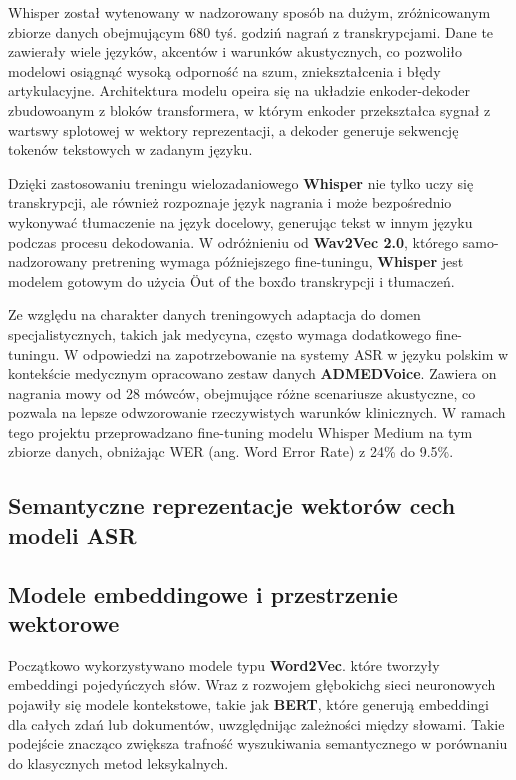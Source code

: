 Whisper został wytenowany w nadzorowany sposób na dużym, zróżnicowanym zbiorze danych obejmującym 680 tyś. godziń nagrań z transkrypcjami. Dane te zawierały wiele języków, akcentów i warunków akustycznych, co pozwoliło modelowi osiągnąć wysoką odporność na szum, zniekształcenia i błędy artykulacyjne. Architektura modelu opeira się na układzie enkoder-dekoder zbudowoanym z bloków transformera, w którym enkoder przekształca sygnał z wartswy splotowej w wektory reprezentacji, a dekoder generuje sekwencję tokenów tekstowych w zadanym języku.

Dzięki zastosowaniu treningu wielozadaniowego \textbf{Whisper} nie tylko uczy się transkrypcji, ale również rozpoznaje język nagrania i może bezpośrednio wykonywać tłumaczenie na język docelowy, generując tekst w innym języku podczas procesu dekodowania. W odróżnieniu od \textbf{Wav2Vec 2.0}, którego samo-nadzorowany pretrening wymaga późniejszego fine-tuningu, \textbf{Whisper} jest modelem gotowym do użycia \"Out of the box\" do transkrypcji i tłumaczeń.

Ze względu na charakter danych treningowych adaptacja do domen specjalistycznych, takich jak medycyna, często wymaga dodatkowego fine-tuningu. W odpowiedzi na zapotrzebowanie na systemy ASR w języku polskim w kontekście medycznym opracowano zestaw danych \textbf{ADMEDVoice}\cite{ADMEDVoice}. Zawiera on nagrania mowy od 28 mówców, obejmujące różne scenariusze akustyczne, co pozwala na lepsze odwzorowanie rzeczywistych warunków klinicznych. W ramach tego projektu przeprowadzano fine-tuning modelu Whisper Medium na tym zbiorze danych, obniżając WER (ang. Word Error Rate) z 24\% do 9.5\%. 

\subsection{Semantyczne reprezentacje wektorów cech modeli ASR }

\subsection{Modele embeddingowe i przestrzenie wektorowe}
Początkowo wykorzystywano modele typu \textbf{Word2Vec}\cite{mikolov2013efficient}. które tworzyły embeddingi pojedyńczych słów. Wraz z rozwojem głębokichg sieci neuronowych pojawiły się modele kontekstowe, takie jak \textbf{BERT}\cite{devlin2019bert}, które generują embeddingi dla całych zdań lub dokumentów, uwzględnijąc zależności między słowami. Takie podejście znacząco zwiększa trafność wyszukiwania semantycznego w porównaniu do klasycznych metod leksykalnych.

